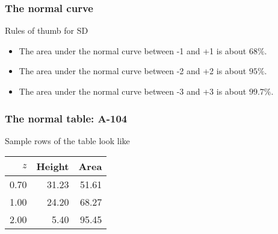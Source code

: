 \documentclass[handout]{beamer}
\begin{document}

   \begin{frame} \frametitle{The normal curve}

   \begin{block}
   {Rules of thumb for SD}
   \begin{itemize}
   \item The area under the normal curve between -1 and +1 is about $68\%$.
   \item The area under the normal curve between -2 and +2 is about $95\%$.
   \item The area under the normal curve between -3 and +3 is about $99.7\%$.
   \end{itemize}
   \end{block}
   \end{frame}


   \begin{frame} \frametitle{The normal table: A-104}

   \begin{block}
   {Sample rows of the table look like}
   \begin{tabular}{rrr}
   $z$ & Height & Area \\ \hline
   0.70 & 31.23 & 51.61 \\
   1.00 & 24.20 & 68.27 \\
   2.00 & 5.40 & 95.45 \\
   \end{tabular}
   \end{block}
   \end{frame}

\end{document}
